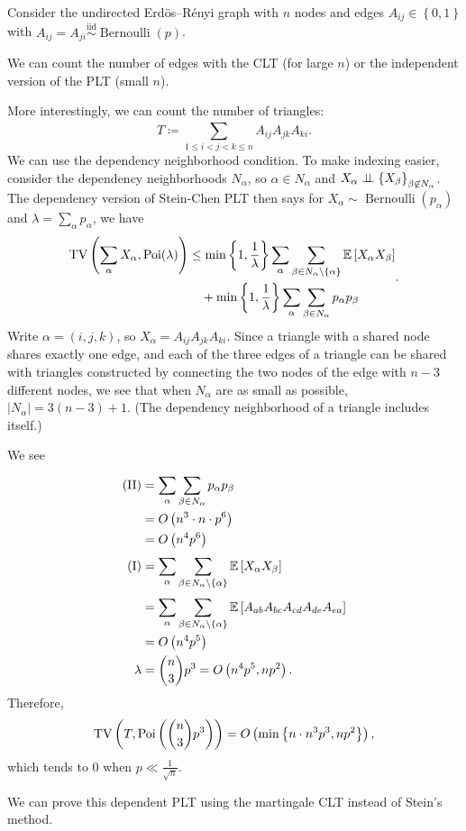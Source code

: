 \begin{example}
	Consider the undirected Erd\"os--R\'enyi graph with $n$ nodes and edges $A_{ij} \in \left\{0,1\right\}$ with $A_{ij} = A_{ji} \overset{\text{iid}}{\sim} \operatorname{Bernoulli}(p)$.

	We can count the number of edges with the CLT (for large $n$) or the independent version of the PLT (small $n$).

	More interestingly, we can count the number of triangles: \[
		T \coloneqq \sum\limits_{1 \le i < j < k \le n}^{} A_{i j}A_{jk}A_{ki}
	.\] 
		We can use the dependency neighborhood condition. To make indexing easier, consider the dependency neighborhoods $N_\alpha$, so $\alpha \in N_\alpha$ and $X_\alpha \perp\!\!\!\perp \left\{X_\beta\right\}_{\beta \not\in  N_\alpha}$. The dependency version of Stein-Chen PLT then says for $X_\alpha \sim \operatorname{Bernoulli}(p_\alpha)$ and $\lambda = \sum_\alpha p_\alpha$, we have \[
			\begin{aligned}
				\operatorname{TV}\left( \sum\limits_{\alpha}^{} X_\alpha, \operatorname{Poi}(\lambda) \right)
				&\le \min \left\{1,\frac{1}{\lambda}\right\} \sum\limits_{\alpha}^{} \sum\limits_{\beta \in N_\alpha \setminus \left\{\alpha\right\}}^{} \mathbb{E}\left[X_\alpha X_\beta\right] \\
				&\quad + \min \left\{1,\frac{1}{\lambda}\right\} \sum\limits_{\alpha}^{} \sum\limits_{\beta \in N_\alpha}^{} p_\alpha p_\beta
			\end{aligned}
		.\] 
	Write $\alpha = \left( i,j,k \right)$, so $X_\alpha = A_{ij}A_{jk}A_{ki}$. Since a triangle with a shared node shares exactly one edge, and each of the three edges of a triangle can be shared with triangles constructed by connecting the two nodes of the edge with $n-3$ different nodes, we see that when $N_\alpha$ are as small as possible, $\left| N_\alpha \right| = 3(n-3) +1$. (The dependency neighborhood of a triangle includes itself.)

	We see
	\begin{align*}
		\text{(II)}
		&= \sum\limits_{\alpha}^{} \sum\limits_{\beta \in N_\alpha}^{} p_\alpha p_\beta \\
		&= O\left( n^3 \cdot n \cdot p^6 \right) \\
		&= O\left( n^4 p^6 \right) \\
		\text{(I)}
		&= \sum\limits_{\alpha}^{} \sum\limits_{\beta \in N_\alpha\setminus \left\{\alpha\right\}}^{} \mathbb{E}\left[X_\alpha X_\beta\right]  \\
		&= \sum\limits_{\alpha}^{} \sum\limits_{\beta \in N_\alpha \setminus \left\{\alpha\right\}}^{} \mathbb{E}\left[A_{ab}A_{bc}A_{cd}A_{de}A_{ea}\right] \\
		&= O\left( n^4 p^5 \right) \\
		\lambda &= \binom{n}{3}p^3 = O\left( n^4 p^5, np^2\right)
	.\end{align*}
	Therefore, \[
		\operatorname{TV}\left( T, \operatorname{Poi}\left( \binom{n}{3}p^3 \right) \right) = O\left( \min \left\{n \cdot n^3 p^3, np^2\right\} \right)
	,\] 
	which tends to $0$ when $p \ll \frac{1}{\sqrt{n} }$.
\end{example}

\begin{remark}
	We can prove this dependent PLT using the martingale CLT instead of Stein's method.
\end{remark}



